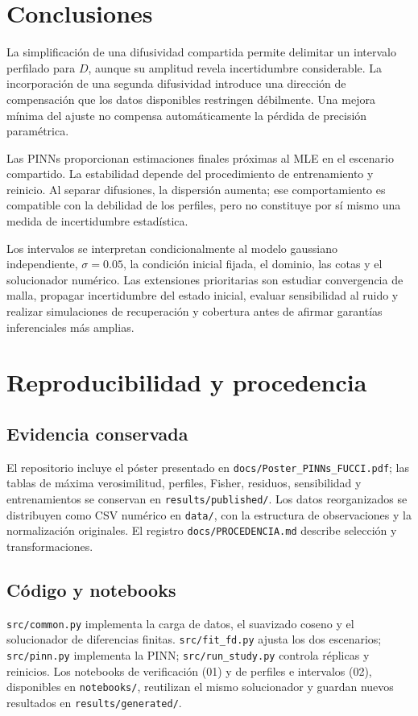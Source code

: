 \documentclass[11pt,a4paper]{report}
\begin{document}
\chapter{Conclusiones}
La simplificación de una difusividad compartida permite delimitar un intervalo perfilado para $D$, aunque su amplitud revela incertidumbre considerable. La incorporación de una segunda difusividad introduce una dirección de compensación que los datos disponibles restringen débilmente. Una mejora mínima del ajuste no compensa automáticamente la pérdida de precisión paramétrica.

Las PINNs proporcionan estimaciones finales próximas al MLE en el escenario compartido. La estabilidad depende del procedimiento de entrenamiento y reinicio. Al separar difusiones, la dispersión aumenta; ese comportamiento es compatible con la debilidad de los perfiles, pero no constituye por sí mismo una medida de incertidumbre estadística.

Los intervalos se interpretan condicionalmente al modelo gaussiano independiente, $\sigma=0.05$, la condición inicial fijada, el dominio, las cotas y el solucionador numérico. Las extensiones prioritarias son estudiar convergencia de malla, propagar incertidumbre del estado inicial, evaluar sensibilidad al ruido y realizar simulaciones de recuperación y cobertura antes de afirmar garantías inferenciales más amplias.

\chapter{Reproducibilidad y procedencia}
\section{Evidencia conservada}
El repositorio incluye el póster presentado en \texttt{docs/Poster\_PINNs\_FUCCI.pdf}; las tablas de máxima verosimilitud, perfiles, Fisher, residuos, sensibilidad y entrenamientos se conservan en \texttt{results/published/}. Los datos reorganizados se distribuyen como CSV numérico en \texttt{data/}, con la estructura de observaciones y la normalización originales. El registro \texttt{docs/PROCEDENCIA.md} describe selección y transformaciones.

\section{Código y notebooks}
\texttt{src/common.py} implementa la carga de datos, el suavizado coseno y el solucionador de diferencias finitas. \texttt{src/fit\_fd.py} ajusta los dos escenarios; \texttt{src/pinn.py} implementa la PINN; \texttt{src/run\_study.py} controla réplicas y reinicios. Los notebooks de verificación (01) y de perfiles e intervalos (02), disponibles en \texttt{notebooks/}, reutilizan el mismo solucionador y guardan nuevos resultados en \texttt{results/generated/}.
\end{document}
